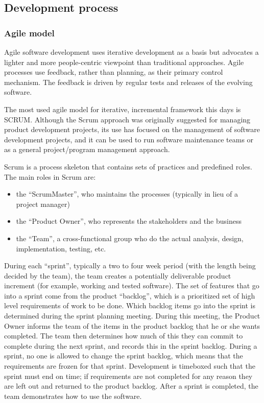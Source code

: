 \subsection{Development process}

	\subsubsection{Agile model}
	
	Agile software development uses iterative development as a basis but advocates a lighter and more people-centric viewpoint than traditional approaches. Agile processes use feedback, rather than planning, as their primary control mechanism. The feedback is driven by regular tests and releases of the evolving software. \cite{wiki:development process}
	
	The most used agile model for iterative, incremental framework this days is SCRUM. Although the Scrum approach was originally suggested for managing product development projects, its use has focused on the management of software development projects, and it can be used to run software maintenance teams or as a general project/program management approach.\newline
	
	Scrum is a process skeleton that contains sets of practices and predefined roles. The main roles in Scrum are:
	
	\begin{itemize}
		\item the “ScrumMaster”, who maintains the processes (typically in lieu of a project manager)
		\item the “Product Owner”, who represents the stakeholders and the business
		\item the “Team”, a cross-functional group who do the actual analysis, design, implementation, testing, etc.
	\end{itemize}
	
	During each “sprint”, typically a two to four week period (with the length being decided by the team), the team creates a potentially deliverable product increment (for example, working and tested software). The set of features that go into a sprint come from the product “backlog”, which is a prioritized set of high level requirements of work to be done. Which backlog items go into the sprint is determined during the sprint planning meeting. During this meeting, the Product Owner informs the team of the items in the product backlog that he or she wants completed. The team then determines how much of this they can commit to complete during the next sprint, and records this in the sprint backlog. During a sprint, no one is allowed to change the sprint backlog, which means that the requirements are frozen for that sprint. Development is timeboxed such that the sprint must end on time; if requirements are not completed for any reason they are left out and returned to the product backlog. After a sprint is completed, the team demonstrates how to use the software.\newline
	
